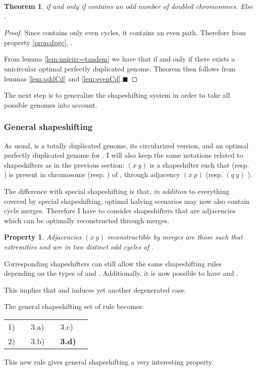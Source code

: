 \documentclass[11pt,final,twoside,nofrench]{thlifl}
\newcommand{\qed}{\ensuremath{\blacksquare}}
\newcommand{\fst}[1]{ \ensuremath{#1} }
\newcommand\aff[2]{\ensuremath{(\fst{#1}~\fst{#2})}}
\newtheorem{property}{Property}
\newtheorem{proof}{Proof}
\newtheorem{theorem}{Theorem}
\begin{document}
{\begin{theorem}
 if and only if  contains an odd number of doubled chromosomes. Else .
\end{theorem}

\begin{proof} 
Since  contains only even cycles, it contains an even path. Therefore from property \ref{prop:dpgc}, .

From lemma \ref{lem:unicirc=tandem} we have that  if and only if there exists a unicircular optimal perfectly duplicated genome.
Theorem then follows from lemmas \ref{lem:oddCd} and \ref{lem:evenCd}.\qed 
\end{proof}

The next step is to generalize the shapeshifting system in order to take all possible genomes into account.

\subsubsection{General shapeshifting}

As usual,  is a totally duplicated genome,  its circularized version, and  an optimal perfectly duplicated genome for .
I will also keep the same notations related to shapeshifters as in the previous section: \aff{x}{y} is a shapeshifter such that  (resp. ) is present in chromosome  (resp. ) of , through adjacency \aff{x}{p} (resp. \aff{q}{y} ).

The difference with special shapeshifting is that, \emph{in addition} to everything covered by special shapeshifting, optimal halving scenarios may now also contain cycle merges. Therefore I have to consider shapeshifters that are adjacencies which can be optimally reconstructed through merges.

\begin{property}
Adjacencies \aff{x}{y} reconstructible by merges are those such that extremities  and  are in \emph{two distinct odd cycles} of .
\end{property}

Corresponding shapeshifters can still allow the same shapeshifting rules depending on the types of  and . Additionally, it is now possible to have  and .

This implies that  and induces yet another
degenerated case.

The general shapeshifting set of rule becomes: 
\begin{center}
    \begin{tabular}{ll@{}ll@{}ll}
        1) & {}   & 3.a) & {} & 3.c) & {} \\
        2) & {} & 3.b) & {} & \textbf{3.d)} & {} \\
    \end{tabular}
\end{center}
This new rule gives general shapeshifting a very interesting property.

}
\end{document}
